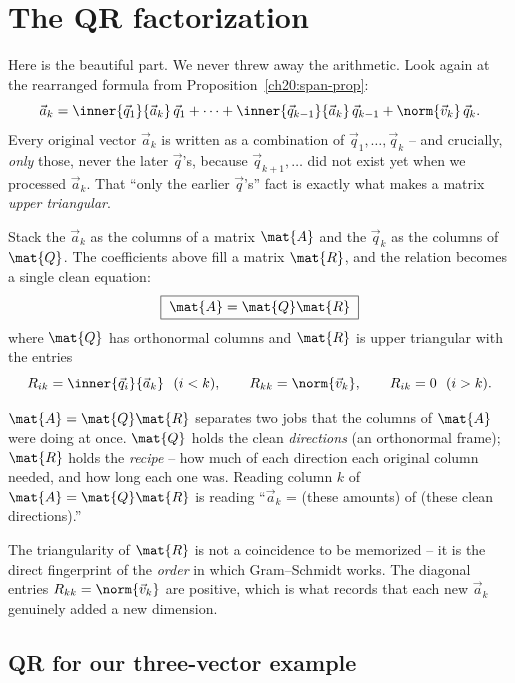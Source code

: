 \section{The QR factorization}

Here is the beautiful part. We never threw away the arithmetic. Look again at the
rearranged formula from Proposition~\ref{ch20:span-prop}:
\[
  \vec{a}_k = \inner{\vec{q}_1}{\vec{a}_k}\,\vec{q}_1
            + \dots
            + \inner{\vec{q}_{k-1}}{\vec{a}_k}\,\vec{q}_{k-1}
            + \norm{\vec{v}_k}\,\vec{q}_k.
\]
Every original vector $\vec{a}_k$ is written as a combination of
$\vec{q}_1,\dots,\vec{q}_k$ -- and crucially, \emph{only} those, never the later
$\vec{q}$'s, because $\vec{q}_{k+1},\dots$ did not exist yet when we processed
$\vec{a}_k$. That ``only the earlier $\vec{q}$'s'' fact is exactly what makes a matrix
\emph{upper triangular}.

Stack the $\vec{a}_k$ as the columns of a matrix $\mat{A}$ and the $\vec{q}_k$ as the
columns of $\mat{Q}$. The coefficients above fill a matrix $\mat{R}$, and the relation
becomes a single clean equation:
\[
  \boxed{\;\mat{A} = \mat{Q}\mat{R}\;}
\]
where $\mat{Q}$ has orthonormal columns and $\mat{R}$ is upper triangular with the
entries
\[
  R_{ik} = \inner{\vec{q}_i}{\vec{a}_k}\ \ (i<k),
  \qquad
  R_{kk} = \norm{\vec{v}_k},
  \qquad
  R_{ik}=0\ \ (i>k).
\]

\begin{intuitionbox}
$\mat{A}=\mat{Q}\mat{R}$ separates two jobs that the columns of $\mat{A}$ were doing at
once. $\mat{Q}$ holds the clean \emph{directions} (an orthonormal frame); $\mat{R}$
holds the \emph{recipe} -- how much of each direction each original column needed, and
how long each one was. Reading column $k$ of $\mat{A}=\mat{Q}\mat{R}$ is reading
``$\vec{a}_k$ = (these amounts) of (these clean directions).''
\end{intuitionbox}

The triangularity of $\mat{R}$ is not a coincidence to be memorized -- it is the
direct fingerprint of the \emph{order} in which Gram--Schmidt works. The diagonal
entries $R_{kk}=\norm{\vec{v}_k}$ are positive, which is what records that each new
$\vec{a}_k$ genuinely added a new dimension.

\subsection{QR for our three-vector example}

